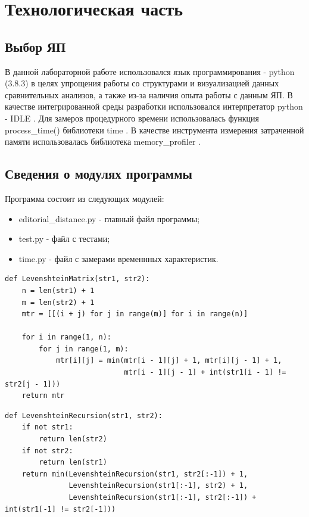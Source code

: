 \documentclass[12pt]{report}
\begin{document}
\chapter{Технологическая часть}
\section{Выбор ЯП}
В данной лабораторной работе использовался язык программирования - python (3.8.3) \cite{bib1} в целях упрощения работы со структурами и визуализацией данных сравнительных анализов, а также из-за наличия опыта работы с данным ЯП. В качестве интегрированной среды разработки использовался интерпретатор python - IDLE  \cite{bib2}. Для замеров процедурного времени использовалась функция process\_time() библиотеки time \cite{bib3}. В качестве инструмента измерения затраченной памяти использовалась библиотека memory\_profiler \cite{bib4}.

\section{Сведения о модулях программы}
Программа состоит из следующих модулей:
\begin{itemize}
	\item editorial\_distance.py - главный файл программы;
	\item test.py - файл с тестами;
	\item time.py - файл с замерами временнных характеристик.
\end{itemize}

\begin{lstlisting}[label=some-code,caption=Подпрограмма поиска расстояния Левенштейна с помощью таблицы]
def LevenshteinMatrix(str1, str2):
    n = len(str1) + 1
    m = len(str2) + 1
    mtr = [[(i + j) for j in range(m)] for i in range(n)]

    for i in range(1, n):
        for j in range(1, m):
            mtr[i][j] = min(mtr[i - 1][j] + 1, mtr[i][j - 1] + 1,
                            mtr[i - 1][j - 1] + int(str1[i - 1] != str2[j - 1]))
    return mtr
\end{lstlisting}

\begin{lstlisting}[label=some-code,caption=Подпрограмма поиска расстояния Левенштейна рекурентно]
def LevenshteinRecursion(str1, str2):
    if not str1:
        return len(str2)
    if not str2:
        return len(str1)
    return min(LevenshteinRecursion(str1, str2[:-1]) + 1,
               LevenshteinRecursion(str1[:-1], str2) + 1,
               LevenshteinRecursion(str1[:-1], str2[:-1]) + int(str1[-1] != str2[-1]))\end{lstlisting}
\end{document}
